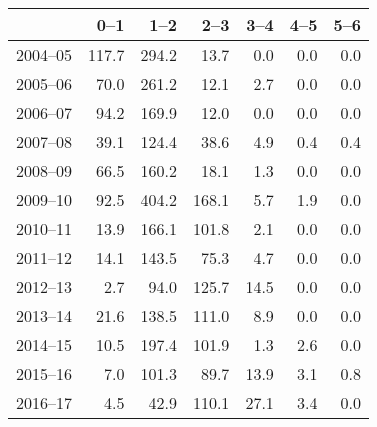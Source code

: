 \begin{table}[ht]
\centering
\begin{tabular}{rrrrrrr}
  \hline
 & 0--1 & 1--2 & 2--3 & 3--4 & 4--5 & 5--6 \\ 
  \hline
2004--05 & 117.7 & 294.2 & 13.7 & 0.0 & 0.0 & 0.0 \\ 
  2005--06 & 70.0 & 261.2 & 12.1 & 2.7 & 0.0 & 0.0 \\ 
  2006--07 & 94.2 & 169.9 & 12.0 & 0.0 & 0.0 & 0.0 \\ 
  2007--08 & 39.1 & 124.4 & 38.6 & 4.9 & 0.4 & 0.4 \\ 
  2008--09 & 66.5 & 160.2 & 18.1 & 1.3 & 0.0 & 0.0 \\ 
  2009--10 & 92.5 & 404.2 & 168.1 & 5.7 & 1.9 & 0.0 \\ 
  2010--11 & 13.9 & 166.1 & 101.8 & 2.1 & 0.0 & 0.0 \\ 
  2011--12 & 14.1 & 143.5 & 75.3 & 4.7 & 0.0 & 0.0 \\ 
  2012--13 & 2.7 & 94.0 & 125.7 & 14.5 & 0.0 & 0.0 \\ 
  2013--14 & 21.6 & 138.5 & 111.0 & 8.9 & 0.0 & 0.0 \\ 
  2014--15 & 10.5 & 197.4 & 101.9 & 1.3 & 2.6 & 0.0 \\ 
  2015--16 & 7.0 & 101.3 & 89.7 & 13.9 & 3.1 & 0.8 \\ 
  2016--17 & 4.5 & 42.9 & 110.1 & 27.1 & 3.4 & 0.0 \\ 
   \hline
\end{tabular}
\end{table}
